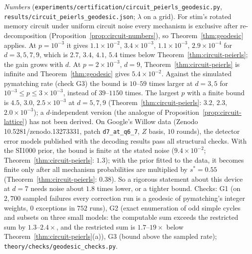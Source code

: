 \noindent\emph{Numbers} (\texttt{experiments/certification/circuit\_peierls\_geodesic.py}, \texttt{results/circuit\_peierls\_geodesic.json}; $\lambda$ on a grid). For stim's rotated memory circuit under uniform circuit noise every mechanism is exclusive after re-decomposition (Proposition~\ref{prop:circuit-numbers}), so Theorem~\ref{thm:geodesic} applies. At $p=10^{-3}$ it gives $1.1\times10^{-2}$, $3.4\times10^{-3}$, $1.1\times10^{-3}$, $2.9\times10^{-4}$ for $d=3,5,7,9$, which is $2.7$, $3.4$, $4.1$, $5.4$ times below Theorem~\ref{thm:circuit-peierls}; the gain grows with $d$. At $p=2\times10^{-3}$, $d=9$, Theorem~\ref{thm:circuit-peierls} is infinite and Theorem~\ref{thm:geodesic} gives $5.4\times10^{-2}$. Against the simulated pymatching rate (check G3) the bound is $10$--$59$ times larger at $d=3,5$ for $10^{-3}\le p\le3\times10^{-3}$, instead of $39$--$1150$ times. The largest $p$ with a finite bound is $4.5$, $3.0$, $2.5\times10^{-3}$ at $d=5,7,9$ (Theorem~\ref{thm:circuit-peierls}: $3.2$, $2.3$, $2.0\times10^{-3}$); a $d$-independent version (the analogue of Proposition~\ref{prop:circuit-lattice}) has not been derived.
On Google's Willow data (Zenodo 10.5281/zenodo.13273331, patch \texttt{d7\_at\_q6\_7}, $Z$ basis, $10$ rounds), the detector error models published with the decoding results pass all structural checks. With the SI1000 prior, the bound is finite at the stated noise ($9.4\times10^{-2}$; Theorem~\ref{thm:circuit-peierls}: $1.3$); with the prior fitted to the data, it becomes finite only after all mechanism probabilities are multiplied by $s^\ast=0.55$ (Theorem~\ref{thm:circuit-peierls}: $0.38$). So a rigorous statement about this device at $d=7$ needs noise about $1.8$ times lower, or a tighter bound.
Checks: G1 (on $2{,}700$ sampled failures every correction run is a geodesic of pymatching's integer weights, $0$ exceptions in $752$ runs), G2 (exact enumeration of odd simple cycles and subsets on three small models: the computable sum exceeds the restricted sum by $1.3$--$2.4\times$, and the restricted sum is $1.7$--$19\times$ below Theorem~\ref{thm:circuit-peierls}(a)), G3 (bound above the sampled rate); \texttt{theory/checks/geodesic\_checks.py}.

